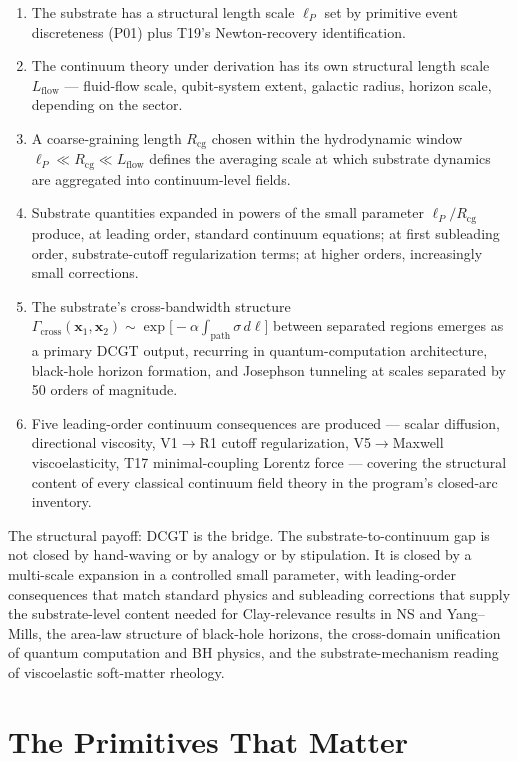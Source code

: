 \documentclass[11pt,a4paper]{article}
\begin{document}
\begin{enumerate}[noitemsep]
  \item The substrate has a structural length scale $\ell_P$ set by primitive event discreteness (P01) plus T19's Newton-recovery identification.
  \item The continuum theory under derivation has its own structural length scale $L_{\mathrm{flow}}$ --- fluid-flow scale, qubit-system extent, galactic radius, horizon scale, depending on the sector.
  \item A coarse-graining length $R_{\mathrm{cg}}$ chosen within the hydrodynamic window $\ell_P \ll R_{\mathrm{cg}} \ll L_{\mathrm{flow}}$ defines the averaging scale at which substrate dynamics are aggregated into continuum-level fields.
  \item Substrate quantities expanded in powers of the small parameter $\ell_P/R_{\mathrm{cg}}$ produce, at leading order, standard continuum equations; at first subleading order, substrate-cutoff regularization terms; at higher orders, increasingly small corrections.
  \item The substrate's cross-bandwidth structure $\Gamma_{\mathrm{cross}}(\mathbf{x}_1, \mathbf{x}_2) \sim \exp\bigl[-\alpha \int_{\mathrm{path}} \sigma\, d\ell\bigr]$ between separated regions emerges as a primary DCGT output, recurring in quantum-computation architecture, black-hole horizon formation, and Josephson tunneling at scales separated by 50 orders of magnitude.
  \item Five leading-order continuum consequences are produced --- scalar diffusion, directional viscosity, V1$\to$R1 cutoff regularization, V5$\to$Maxwell viscoelasticity, T17 minimal-coupling Lorentz force --- covering the structural content of every classical continuum field theory in the program's closed-arc inventory.
\end{enumerate}

The structural payoff: DCGT is the bridge. The substrate-to-continuum gap is not closed by hand-waving or by analogy or by stipulation. It is closed by a multi-scale expansion in a controlled small parameter, with leading-order consequences that match standard physics and subleading corrections that supply the substrate-level content needed for Clay-relevance results in NS and Yang--Mills, the area-law structure of black-hole horizons, the cross-domain unification of quantum computation and BH physics, and the substrate-mechanism reading of viscoelastic soft-matter rheology.

\section{The Primitives That Matter}
\end{document}
